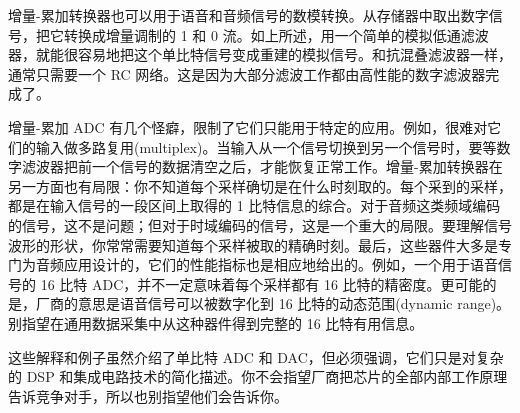 增量-累加转换器也可以用于语音和音频信号的数模转换。从存储器中取出数字信号，把它转换成增量调制的
1 和 0
流。如上所述，用一个简单的模拟低通滤波器，就能很容易地把这个单比特信号变成重建的模拟信号。和抗混叠滤波器一样，通常只需要一个
RC 网络。这是因为大部分滤波工作都由高性能的数字滤波器完成了。

增量-累加 ADC
有几个怪癖，限制了它们只能用于特定的应用。例如，很难对它们的输入做多路复用(multiplex)。当输入从一个信号切换到另一个信号时，要等数字滤波器把前一个信号的数据清空之后，才能恢复正常工作。增量-累加转换器在另一方面也有局限：你不知道每个采样确切是在什么时刻取的。每个采到的采样，都是在输入信号的一段区间上取得的
1
比特信息的综合。对于音频这类频域编码的信号，这不是问题；但对于时域编码的信号，这是一个重大的局限。要理解信号波形的形状，你常常需要知道每个采样被取的精确时刻。最后，这些器件大多是专门为音频应用设计的，它们的性能指标也是相应地给出的。例如，一个用于语音信号的
16 比特 ADC，并不一定意味着每个采样都有 16
比特的精密度。更可能的是，厂商的意思是语音信号可以被数字化到 16
比特的动态范围(dynamic
range)。别指望在通用数据采集中从这种器件得到完整的 16 比特有用信息。

这些解释和例子虽然介绍了单比特 ADC 和 DAC，但必须强调，它们只是对复杂的
DSP
和集成电路技术的简化描述。你不会指望厂商把芯片的全部内部工作原理告诉竞争对手，所以也别指望他们会告诉你。
